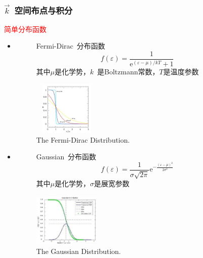 \documentclass[cjk,slidestop,compress,mathserif,blue]{beamer}
\begin{document}
\frame
{
\frametitle{$\vec k$~空间布点与积分}
	\textcolor{red}{简单分布函数}
		\begin{itemize}
			\item 
				\begin{figure}[h!]
					\begin{minipage}[t]{0.40\linewidth}
						\textrm{Fermi-Dirac~}分布函数$$f(\varepsilon)=\dfrac1{\mathrm{e}^{(\varepsilon-\mu)/kT}+1}$$ 
						其中$\mu$是化学势，$k$~是\textrm{Boltzmann}常数，$T$是温度参数
					\end{minipage}
				\hfill
					\begin{minipage}[t]{0.55\linewidth}
					\centering
					\vspace*{-0.35in}
					\hspace*{-0.5in}
					\includegraphics[height=1.0in,width=1.25in,viewport=0 0 530 500,clip]{Figures/Fermi-Dirac-distribution.jpg}
					\caption{\textrm{The Fermi-Dirac Distribution.}}%
					\label{Fermi-Dirac-distribution}
					\end{minipage}
				\end{figure} 
			\item 
				\begin{figure}[h!]
					\begin{minipage}[t]{0.40\linewidth}
						\textrm{Gaussian~}分布函数$$f(\varepsilon)=\dfrac1{\sigma\sqrt{2\pi}}\mathrm{e}^{-\frac{(\varepsilon-\mu)^2}{2\sigma^2}}$$
						其中$\mu$是化学势，$\sigma$是展宽参数
					\end{minipage}
				\hfill
					\begin{minipage}[t]{0.55\linewidth}
					\centering
					\vspace*{-0.35in}
					\hspace*{-0.5in}
					\includegraphics[height=1.0in,width=1.25in,viewport=0 0 530 500,clip]{Figures/Gaussian-distribution.jpg}
					\caption{\small \textrm{The Gaussian Distribution.}}%
					\label{Gaussian-distribution}
					\end{minipage}
				\end{figure} 
		\end{itemize}
}
\end{document}
